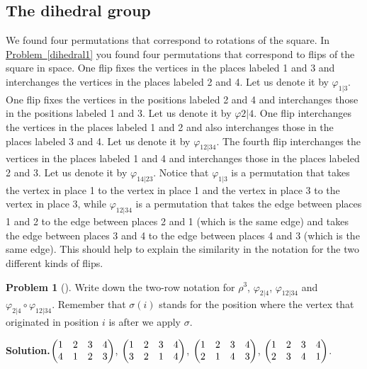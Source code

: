 \documentclass[10pt,]{book}
\theoremstyle{plain}
\theoremstyle{definition}
\newtheorem{activity}[project]{Problem}
\theoremstyle{definition}
\numberwithin{equation}{chapter}
\newcommand{\amp}{&}
\begin{document}
\subsection[{The dihedral group}]{The dihedral group}\label{subsection-53}
We found four permutations that correspond to rotations of the square. In \hyperref[dihedral1]{Problem~\ref{dihedral1}} you found four permutations that correspond to flips of the square in space. One flip fixes the vertices in the places labeled 1 and 3 and interchanges the vertices in the places labeled 2 and 4. Let us denote it by \(\varphi_{1|3}\). One flip fixes the vertices in the positions labeled 2 and 4 and interchanges those in the positions labeled 1 and 3. Let us denote it by \(\varphi{2|4}\). One flip interchanges the vertices in the places labeled 1 and 2 and also interchanges those in the places labeled 3 and 4. Let us denote it by \(\varphi_{12|34}\). The fourth flip interchanges the vertices in the places labeled 1 and 4 and interchanges those in the places labeled 2 and 3. Let us denote it by \(\varphi_{14|23}\). Notice that \(\varphi_{1|3}\) is a permutation that takes the vertex in place 1 to the vertex in place 1 and the vertex in place 3 to the vertex in place 3, while \(\varphi_{12|34}\) is a permutation that takes the edge between places 1 and 2 to the edge between places 2 and 1 (which is the same edge) and takes the edge between places 3 and 4 to the edge between places 4 and 3 (which is the same edge). This should help to explain the similarity in the notation for the two different kinds of flips.%
\begin{activity}[]\label{dihedral2}
Write down the two-row notation for \(\rho^3\), \(\varphi_{2|4}\), \(\varphi_{12|34}\) and \(\varphi_{2|4}\circ \varphi_{12|34}\). Remember that \(\sigma(i)\) stands for the position where the vertex that originated in position \(i\) is after we apply \(\sigma\).%
\par\medskip\noindent%
\textbf{Solution.}\quad \(\begin{pmatrix}1\amp 2\amp 3\amp 4\cr4\amp 1\amp 2\amp 3
\end{pmatrix}\), \(\begin{pmatrix}1\amp 2\amp 3\amp 4\cr3\amp 2\amp 1\amp 4
\end{pmatrix}\), \(\begin{pmatrix}1\amp 2\amp 3\amp 4\cr2\amp 1\amp 4\amp 3
\end{pmatrix}\), \(\begin{pmatrix}1\amp 2\amp 3\amp 4\cr2\amp 3\amp 4\amp 1
\end{pmatrix}\).%
\end{activity}
\end{document}
